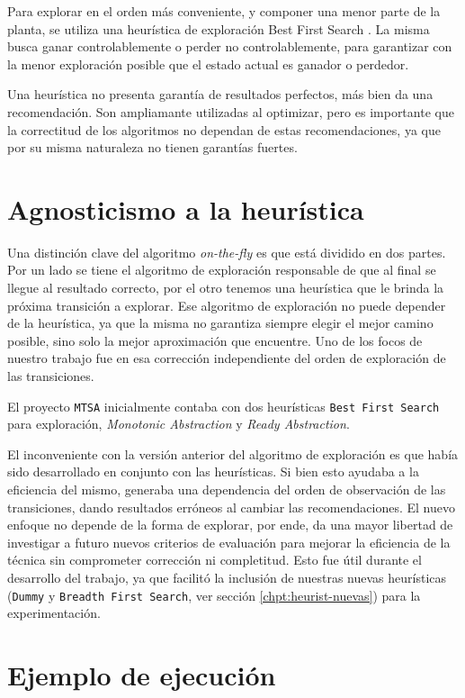 Para explorar en el orden más conveniente, y componer una menor parte de la planta, se utiliza una heurística de exploración Best First Search \cite{tesisDani}. La misma busca ganar controlablemente o perder no controlablemente, para garantizar con la menor exploración posible que el estado actual es ganador o perdedor.

Una heurística no presenta garantía de resultados perfectos, más bien da una recomendación. Son ampliamante utilizadas al optimizar, pero es importante que la correctitud de los algoritmos no dependan de estas recomendaciones, ya que por su misma naturaleza no tienen garantías fuertes.

\section{Agnosticismo a la heurística}

Una distinción clave del algoritmo \textit{on-the-fly} es que está dividido en dos partes. Por un lado se tiene el algoritmo de exploración responsable de que al final se llegue al resultado correcto, por el otro tenemos una heurística que le brinda la próxima transición a explorar. Ese algoritmo de exploración no puede depender de la heurística, ya que la misma no garantiza siempre elegir el mejor camino posible, sino solo la mejor aproximación que encuentre. Uno de los focos de nuestro trabajo fue en esa corrección independiente del orden de exploración de las transiciones.

El proyecto \texttt{MTSA} inicialmente contaba con dos heurísticas \texttt{Best First Search} para exploración, \textit{Monotonic Abstraction} y \textit{Ready Abstraction}. 

El inconveniente con la versión anterior del algoritmo de exploración es que había sido desarrollado en conjunto con las heurísticas. Si bien esto ayudaba a la eficiencia del mismo, generaba una dependencia del orden de observación de las transiciones, dando resultados erróneos al cambiar las recomendaciones. El nuevo enfoque no depende de la forma de explorar, por ende, da una mayor libertad de investigar a futuro nuevos criterios de evaluación para mejorar la eficiencia de la técnica sin comprometer corrección ni completitud. Esto fue útil durante el desarrollo del trabajo, ya que facilitó la inclusión de nuestras nuevas heurísticas (\texttt{Dummy} y \texttt{Breadth First Search}, ver sección \ref{chpt:heurist-nuevas}) para la experimentación.


\section{Ejemplo de ejecución}

